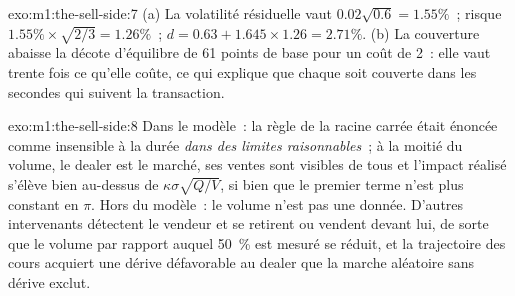\begin{solution}{exo:m1:the-sell-side:7}
(a) La volatilité résiduelle vaut $0.02\sqrt{0.6} = 1.55\%$~; risque
$1.55\% \times \sqrt{2/3} = 1.26\%$~; $d = 0.63 + 1.645 \times 1.26 =
2.71\%$. (b) La couverture abaisse la décote d'équilibre de 61 points de base pour
un coût de 2~: elle vaut trente fois ce qu'elle coûte, ce qui explique que chaque 
soit couverte dans les secondes qui suivent la transaction.
\end{solution}

\begin{solution}{exo:m1:the-sell-side:8}
Dans le modèle~: la règle de la racine carrée était énoncée comme insensible à la durée
\emph{dans des limites raisonnables}~; à la moitié du volume, le dealer est le
marché, ses ventes sont visibles de tous et l'impact réalisé s'élève bien
au-dessus de $\kappa\sigma\sqrt{Q/V}$, si bien que le premier terme n'est plus constant en
$\pi$. Hors du modèle~: le volume n'est pas une donnée. D'autres intervenants détectent
le vendeur et se retirent ou vendent devant lui, de sorte que le volume par rapport auquel
50~\% est mesuré se réduit, et la trajectoire des cours acquiert une dérive défavorable au
dealer que la marche aléatoire sans dérive exclut.
\end{solution}


